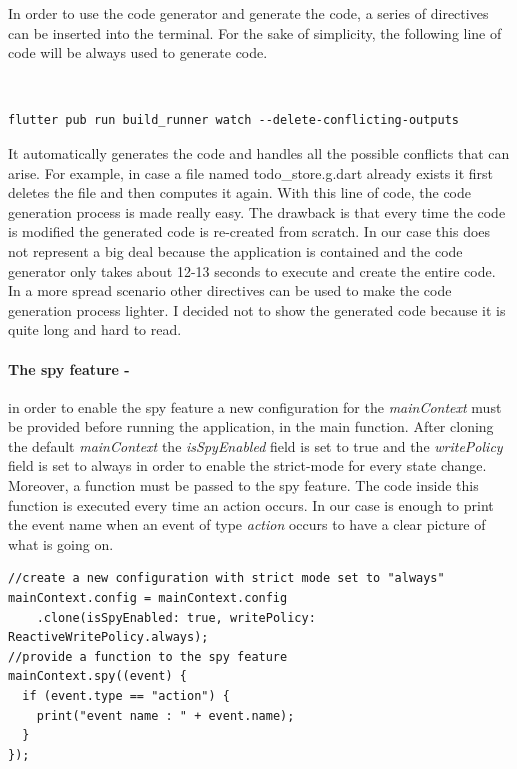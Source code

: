 In order to use the code generator and generate the code, a series of directives can be inserted into the terminal. For the sake of simplicity, the following line of code will be always used to generate code.
\begin{code}
\mbox{}\\
 \mbox{}
		\label{code:2.127}
\begin{verbatim}
flutter pub run build_runner watch --delete-conflicting-outputs
\end{verbatim}
\mbox{}
\end{code}

It automatically generates the code and handles all the possible conflicts that can arise. For example, in case a file named todo\_store.g.dart already exists it first deletes the file and then computes it again. With this line of code, the code generation process is made really easy. The drawback is that every time the code is modified the generated code is re-created from scratch. In our case this does not represent a big deal because the application is contained and the code generator only takes about 12-13 seconds to execute and create the entire code. In a more spread scenario other directives can be used to make the code generation process lighter. I decided not to show the generated code because it is quite long and hard to read.

\paragraph{The spy feature - }
\label{subpar:todo_app_bloc_core_state} in order to enable the spy feature a new configuration for the \textit{mainContext} must be provided before running the application, in the main function. After cloning the default \textit{mainContext} the \textit{isSpyEnabled} field is set to true and the \textit{writePolicy} field  is set to always in order to enable the strict-mode for every state change. Moreover, a function must be passed to the spy feature. The code inside this function is executed every time an action occurs. In our case is enough to print the event name when an event of type \textit{action} occurs to have a clear picture of what is going on.

\begin{code}
\mbox{}
 \mbox{}
		\label{code:2.14}
\begin{verbatim}
//create a new configuration with strict mode set to "always"
mainContext.config = mainContext.config
    .clone(isSpyEnabled: true, writePolicy: ReactiveWritePolicy.always);
//provide a function to the spy feature
mainContext.spy((event) {
  if (event.type == "action") {
    print("event name : " + event.name);
  }
});
\end{verbatim}
\mbox{}
\end{code}


